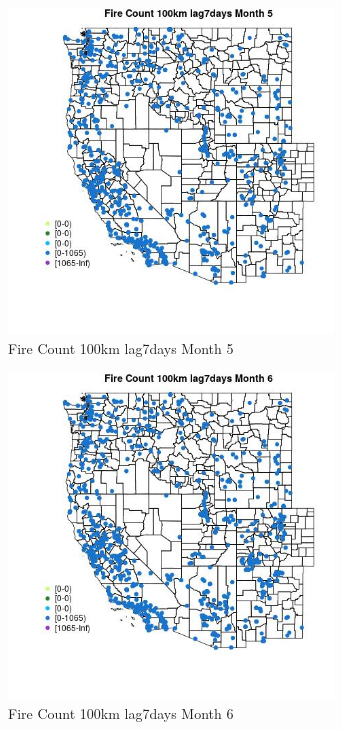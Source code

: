 \begin{figure} 
\centering  
\includegraphics[width=0.77\textwidth]{Code_Outputs/Report_ML_input_PM25_Step4_part_f_de_duplicated_aves_prioritize_24hr_obswNAs_MapObsMo5Fire_Count_100km_lag7days.jpg} 
\caption{\label{fig:Report_ML_input_PM25_Step4_part_f_de_duplicated_aves_prioritize_24hr_obswNAsMapObsMo5Fire_Count_100km_lag7days}Fire Count 100km lag7days Month 5} 
\end{figure} 
 

\begin{figure} 
\centering  
\includegraphics[width=0.77\textwidth]{Code_Outputs/Report_ML_input_PM25_Step4_part_f_de_duplicated_aves_prioritize_24hr_obswNAs_MapObsMo6Fire_Count_100km_lag7days.jpg} 
\caption{\label{fig:Report_ML_input_PM25_Step4_part_f_de_duplicated_aves_prioritize_24hr_obswNAsMapObsMo6Fire_Count_100km_lag7days}Fire Count 100km lag7days Month 6} 
\end{figure} 
 

